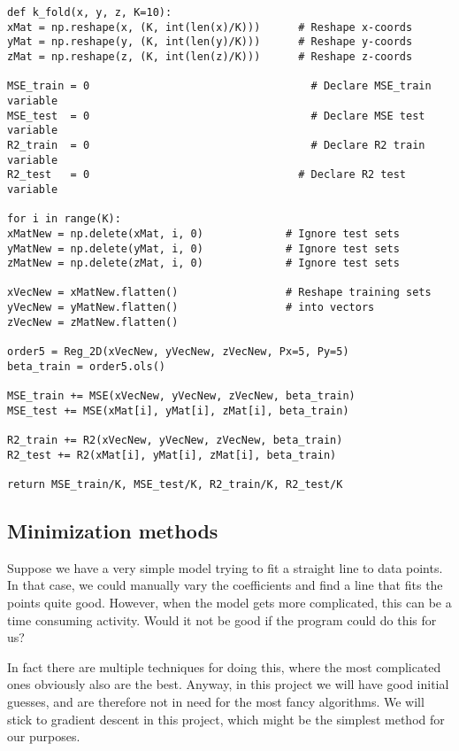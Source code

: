 \lstset{basicstyle=\scriptsize}
\begin{lstlisting}
def k_fold(x, y, z, K=10):
xMat = np.reshape(x, (K, int(len(x)/K)))      # Reshape x-coords
yMat = np.reshape(y, (K, int(len(y)/K)))      # Reshape y-coords
zMat = np.reshape(z, (K, int(len(z)/K)))      # Reshape z-coords

MSE_train = 0	                                # Declare MSE_train variable
MSE_test  = 0	                                # Declare MSE test variable
R2_train  = 0	                                # Declare R2 train variable
R2_test   = 0                                 # Declare R2 test variable

for i in range(K):
xMatNew = np.delete(xMat, i, 0)             # Ignore test sets
yMatNew = np.delete(yMat, i, 0)             # Ignore test sets
zMatNew = np.delete(zMat, i, 0)             # Ignore test sets

xVecNew = xMatNew.flatten()                 # Reshape training sets
yVecNew = yMatNew.flatten()                 # into vectors
zVecNew = zMatNew.flatten()

order5 = Reg_2D(xVecNew, yVecNew, zVecNew, Px=5, Py=5)
beta_train = order5.ols()

MSE_train += MSE(xVecNew, yVecNew, zVecNew, beta_train)
MSE_test += MSE(xMat[i], yMat[i], zMat[i], beta_train)

R2_train += R2(xVecNew, yVecNew, zVecNew, beta_train)
R2_test += R2(xMat[i], yMat[i], zMat[i], beta_train)

return MSE_train/K, MSE_test/K, R2_train/K, R2_test/K
\end{lstlisting}

\subsection{Minimization methods}\label{sec:minimization}
Suppose we have a very simple model trying to fit a straight line to data points. In that case, we could manually vary the coefficients and find a line that fits the points quite good. However, when the model gets more complicated, this can be a time consuming activity. Would it not be good if the program could do this for us?

In fact there are multiple techniques for doing this, where the most complicated ones obviously also are the best. Anyway, in this project we will have good initial guesses, and are therefore not in need for the most fancy algorithms. We will stick to gradient descent in this project, which might be the simplest method for our purposes.

